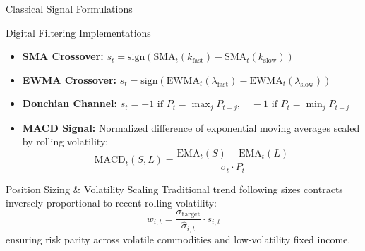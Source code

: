 \documentclass[10pt]{beamer}
\begin{document}
\begin{frame}{Classical Signal Formulations}
  \begin{block}{Digital Filtering Implementations}
    \begin{itemize}\scriptsize
      \item \textbf{SMA Crossover:} $s_t = \text{sign}\left(\text{SMA}_t(k_{\text{fast}}) - \text{SMA}_t(k_{\text{slow}})\right)$
      \item \textbf{EWMA Crossover:} $s_t = \text{sign}\left(\text{EWMA}_t(\lambda_{\text{fast}}) - \text{EWMA}_t(\lambda_{\text{slow}})\right)$
      \item \textbf{Donchian Channel:} $s_t = +1 \text{ if } P_t = \max_{j} P_{t-j}, \quad -1 \text{ if } P_t = \min_{j} P_{t-j}$
      \item \textbf{MACD Signal:} Normalized difference of exponential moving averages scaled by rolling volatility:
      \begin{equation*}
        \text{MACD}_t(S, L) = \frac{\text{EMA}_t(S) - \text{EMA}_t(L)}{\sigma_t \cdot P_t}
      \end{equation*}
    \end{itemize}
  \end{block}
  \begin{block}{Position Sizing \& Volatility Scaling}
    Traditional trend following sizes contracts inversely proportional to recent rolling volatility:
    \begin{equation*}
      w_{i,t} = \frac{\sigma_{\text{target}}}{\hat{\sigma}_{i,t}} \cdot s_{i,t}
    \end{equation*}
    ensuring risk parity across volatile commodities and low-volatility fixed income.
  \end{block}
\end{frame}
\end{document}
